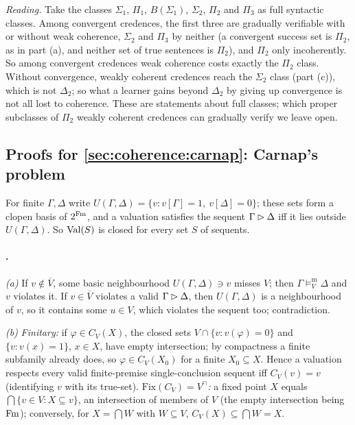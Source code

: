 \emph{Reading.} Take the classes $\Sigma_1$, $\Pi_1$, $B(\Sigma_1)$, $\Sigma_2$, $\Pi_2$ and $\Pi_3$ as full syntactic classes. Among convergent credences, the first three are gradually verifiable with or without weak coherence, $\Sigma_2$ and $\Pi_3$ by neither (a convergent success set is $\Pi_2$, as in part (a), and neither set of true sentences is $\Pi_2$), and $\Pi_2$ only incoherently. So among convergent credences weak coherence costs exactly the $\Pi_2$ class. Without convergence, weakly coherent credences reach the $\Sigma_2$ class (part (c)), which is not $\Delta_2$; so what a learner gains beyond $\Delta_2$ by giving up convergence is not all lost to coherence. These are statements about full classes; which proper subclasses of $\Pi_2$ weakly coherent credences can gradually verify we leave open.

\subsection{Proofs for \texorpdfstring{\cref{sec:coherence:carnap}}{Section 6.4}: Carnap's problem}\label{app:coherence:carnap}

For finite $\Gamma,\Delta$ write $U(\Gamma,\Delta)=\{v:v[\Gamma]=1,\ v[\Delta]=0\}$; these sets form a clopen basis of $2^{\mathrm{Fm}}$, and a valuation satisfies the sequent $\Gamma\rhd\Delta$ iff it lies outside $U(\Gamma,\Delta)$. So $\mathrm{Val}(S)$ is closed for every set $S$ of sequents.

\paragraph{.} \emph{(a)} If $v\notin\overline V$, some basic neighbourhood $U(\Gamma,\Delta)\ni v$ misses $V$; then $\Gamma\models^{\mathrm m}_V\Delta$ and $v$ violates it. If $v\in\overline V$ violates a valid $\Gamma\rhd\Delta$, then $U(\Gamma,\Delta)$ is a neighbourhood of $v$, so it contains some $u\in V$, which violates the sequent too; contradiction.

\emph{(b)} \emph{Finitary:} if $\varphi\in C_V(X)$, the closed sets $V\cap\{v:v(\varphi)=0\}$ and $\{v:v(x)=1\}$, $x\in X$, have empty intersection; by compactness a finite subfamily already does, so $\varphi\in C_V(X_0)$ for a finite $X_0\subseteq X$. Hence a valuation respects every valid finite-premise single-conclusion sequent iff $C_V(v)=v$ (identifying $v$ with its true-set). \emph{$\mathrm{Fix}(C_V)=V^\cap$:} a fixed point $X$ equals $\bigcap\{v\in V:X\subseteq v\}$, an intersection of members of $V$ (the empty intersection being $\mathrm{Fm}$); conversely, for $X=\bigcap W$ with $W\subseteq V$, $C_V(X)\subseteq\bigcap W=X$.

